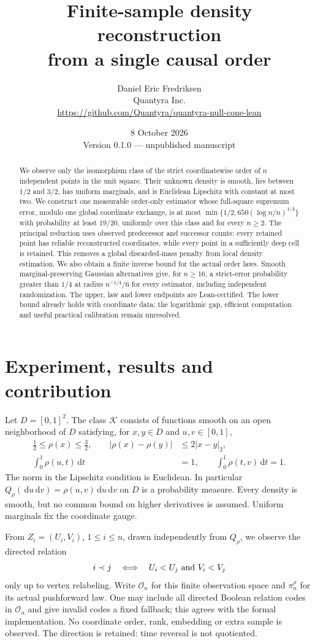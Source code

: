 \documentclass[11pt]{article}
\title{Finite-sample density reconstruction\\from a single causal order}
\author{Daniel Eric Fredriksen\\Quantyra Inc.\\
\url{https://github.com/Quantyra/quantyra-null-cone-lean}}
\date{8 October 2026\\Version 0.1.0 --- unpublished manuscript}
\theoremstyle{remark}
\newcommand{\K}{\mathcal K}
\newcommand{\dd}{\,\mathrm d}
\begin{document}
\maketitle
\begin{abstract}
We observe only the isomorphism class of the strict coordinatewise order
of $n$ independent points in the unit square. Their unknown density is
smooth, lies between $1/2$ and $3/2$, has uniform marginals, and is
Euclidean Lipschitz with constant at most two. We construct one measurable
order-only estimator whose full-square supremum error, modulo one global
coordinate exchange, is at most
$\min\{1/2,650(\log n/n)^{1/4}\}$ with probability at least $19/20$,
uniformly over this class and for every $n\ge2$.
The principal reduction uses observed predecessor and successor counts:
every retained point has reliable reconstructed coordinates, while every
point in a sufficiently deep cell is retained. This removes a global
discarded-mass penalty from local density estimation. We also obtain a
finite inverse bound for the actual order laws. Smooth marginal-preserving
Gaussian alternatives give, for $n\ge16$, a strict-error probability
greater than $1/4$ at radius $n^{-1/4}/6$ for every estimator, including
independent randomization. The upper, law and lower endpoints are
Lean-certified. The lower bound already holds with coordinate data;
the logarithmic gap, efficient computation and useful practical
calibration remain unresolved.
\end{abstract}

\section{Experiment, results and contribution}
\label{sec:results}
Let $D=[0,1]^2$. The class $\K$ consists of functions smooth on an open
neighborhood of $D$ satisfying, for $x,y\in D$ and $u,v\in[0,1]$,
\begin{align}
 \tfrac12\le\rho(x)\le\tfrac32,\qquad
 |\rho(x)-\rho(y)|&\le2|x-y|_2, \label{eq:class}\\
 \int_0^1\rho(u,t)\dd t&=1,\qquad
 \int_0^1\rho(t,v)\dd t=1. \nonumber
\end{align}
The norm in the Lipschitz condition is Euclidean. In particular
$Q_\rho(\dd u\dd v)=\rho(u,v)\dd u\dd v$ on $D$ is a probability measure.
Every density is smooth, but no common bound on higher derivatives is
assumed. Uniform marginals fix the coordinate gauge.

From $Z_i=(U_i,V_i)$, $1\le i\le n$, drawn independently from $Q_\rho$,
we observe the directed relation
\[
 i\prec j\quad\Longleftrightarrow\quad U_i<U_j\ \hbox{and}\ V_i<V_j
\]
only up to vertex relabeling. Write $\mathcal O_n$ for this finite
observation space and $\pi_n^\rho$ for its actual pushforward law.
One may include all directed Boolean relation codes in $\mathcal O_n$
and give invalid codes a fixed fallback; this agrees with the formal
implementation. No coordinate order, rank, embedding or extra sample
is observed. The direction is retained: time reversal is not quotiented.
\end{document}
